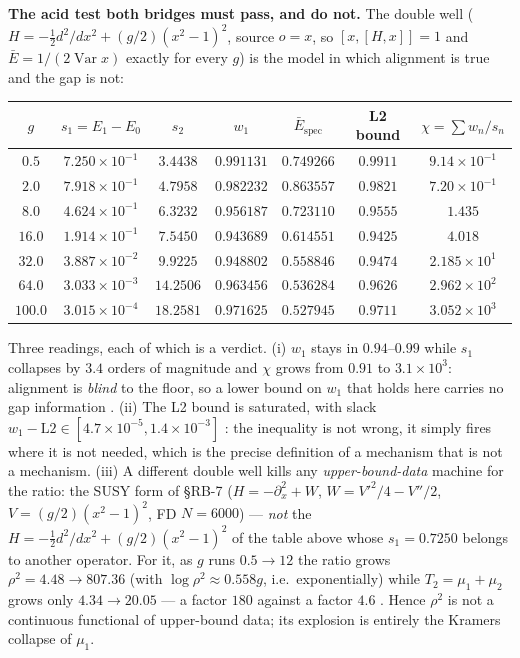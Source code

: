 \textbf{The acid test both bridges must pass, and do not.} The double well
($H=-\tfrac12d^2/dx^2+(g/2)(x^2-1)^2$, source $o=x$, so $[x,[H,x]]=1$ and
$\bar E=1/(2\operatorname{Var}x)$ exactly for every $g$) is the model in which alignment is true and
the gap is not:

\begin{center}
\footnotesize
\begin{tabular}{@{}ccccccc@{}}
\toprule
$g$ & $s_1=E_1-E_0$ & $s_2$ & $w_1$ & $\bar E_{\mathrm{spec}}$ & L2 bound & $\chi=\sum w_n/s_n$\\
\midrule
$0.5$   & $7.250\times10^{-1}$ & $3.4438$  & $0.991131$ & $0.749266$ & $0.9911$ & $9.14\times10^{-1}$\\
$2.0$   & $7.918\times10^{-1}$ & $4.7958$  & $0.982232$ & $0.863557$ & $0.9821$ & $7.20\times10^{-1}$\\
$8.0$   & $4.624\times10^{-1}$ & $6.3232$  & $0.956187$ & $0.723110$ & $0.9555$ & $1.435$\\
$16.0$  & $1.914\times10^{-1}$ & $7.5450$  & $0.943689$ & $0.614551$ & $0.9425$ & $4.018$\\
$32.0$  & $3.887\times10^{-2}$ & $9.9225$  & $0.948802$ & $0.558846$ & $0.9474$ & $2.185\times10^{1}$\\
$64.0$  & $3.033\times10^{-3}$ & $14.2506$ & $0.963456$ & $0.536284$ & $0.9626$ & $2.962\times10^{2}$\\
$100.0$ & $3.015\times10^{-4}$ & $18.2581$ & $0.971625$ & $0.527945$ & $0.9711$ & $3.052\times10^{3}$\\
\bottomrule
\end{tabular}
\end{center}

Three readings, each of which is a verdict. (i) $w_1$ stays in $0.94$--$0.99$ while $s_1$ collapses
by $3.4$ orders of magnitude and $\chi$ grows from $0.91$ to $3.1\times10^3$: alignment is
\emph{blind} to the floor, so a lower bound on $w_1$ that holds here carries no gap information
\LE. (ii) The L2 bound is saturated, with slack $w_1-\mathrm{L2}\in[4.7\times10^{-5},
1.4\times10^{-3}]$ \LE: the inequality is not wrong, it simply fires where it is not needed, which
is the precise definition of a mechanism that is not a mechanism. (iii) A different double well
kills any \emph{upper-bound-data} machine for the ratio: the SUSY form of
 \S RB-7 ($H=-\partial_x^2+W$, $W=V'^2/4-V''/2$, $V=(g/2)(x^2-1)^2$,
FD $N=6000$) --- \emph{not} the $H=-\tfrac12d^2/dx^2+(g/2)(x^2-1)^2$ of the table above whose
$s_1=0.7250$ belongs to another operator. For it, as $g$ runs $0.5\to12$ the ratio grows
$\rho^2=4.48\to807.36$ (with $\log\rho^2\approx0.558g$, i.e.\ exponentially) while
$T_2=\mu_1+\mu_2$ grows only $4.34\to20.05$ --- a factor $180$ against a factor $4.6$ \LE.
Hence $\rho^2$ is not a continuous functional of upper-bound data; its explosion is entirely the
Kramers collapse of $\mu_1$.

